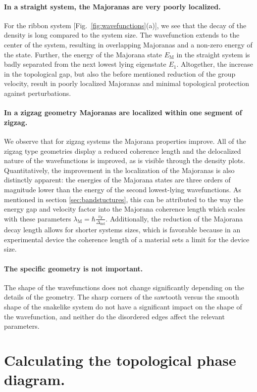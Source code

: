 \documentclass[english, twocolumn, 10pt, aps, superscriptaddress, floatfix, prb, citeautoscript]{revtex4-1}
\renewcommand{\comment}[2]{#2}
\renewcommand{\comment}{\paragraph}
\begin{document}
\comment{In a straight system, the Majoranas are very poorly localized.}
For the ribbon system [Fig.~\ref{fig:wavefunctions}(a)], we see that the decay of the density is long compared to the system size.
The wavefunction extends to the center of the system, resulting in overlapping Majoranas and a non-zero energy of the state.
Further, the energy of the Majorana state $E_\textrm{M}$ in the straight system is badly separated from the next lowest lying eigenstate $E_1$.
Altogether, the increase in the topological gap, but also the before mentioned reduction of the group velocity, result in poorly localized Majoranas and minimal topological protection against perturbations.  %

\comment{In a zigzag geometry Majoranas are localized within one segment of zigzag.}
We observe that for zigzag systems the Majorana properties improve.
All of the zigzag type geometries display a reduced coherence length and the delocalized nature of the wavefunctions is improved, as is visible through the density plots.
Quantitatively, the improvement in the localization of the Majoranas is also distinctly apparent: the energies of the Majorana states are three orders of magnitude lower than the energy of the second lowest-lying wavefunctions.
As mentioned in section \ref{sec:bandstuctures}, this can be attributed to the way the energy gap and velocity factor into the Majorana coherence length which scales with these parameters $\lambda_\textrm{M}=\hbar\frac{v_\textrm{F}}{\Delta_\textrm{ind}}$.
Additionally, the reduction of the Majorana decay length allows for shorter systems sizes, which is favorable because in an experimental device the coherence length of a material sets a limit for the device size.

\comment{The specific geometry is not important.}
The shape of the wavefunctions does not change significantly depending on the details of the geometry.
The sharp corners of the sawtooth versus the smooth shape of the snakelike system do not have a significant impact on the shape of the wavefunction, and neither do the disordered edges affect the relevant parameters.

\section{Calculating the topological phase diagram.}
\end{document}
